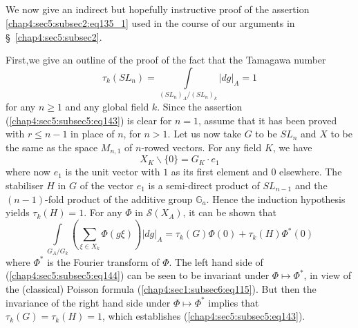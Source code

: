 \subsection{}\label{chap4:sec5:subsec6}%

We now give an indirect but hopefully instructive proof of the
assertion \ref{chap4:sec5:subsec2:eq135_1} used in the course of our
arguments in \S\ \ref{chap4:sec5:subsec2}. 

First,\pageoriginale we give an outline of the proof of the fact that
the Tamagawa number 
\begin{equation*}
  \tau_{k}(SL_{n})=\int\limits_{(SL_{n})_{A}/(SL_{n})_{k}}|dg|_{A}=1
  \tag{143}\label{chap4:sec5:subsec5:eq143} 
\end{equation*}
for any $n\geq 1$ and any global field $k$. Since the assertion
(\ref{chap4:sec5:subsec5:eq143})
 is clear for $n=1$, assume that it has been proved with $r\leq n-1$
 in place of $n$, for $n>1$. Let us now take $G$ to be $SL_{n}$ and
 $X$ to be the same as the space $M_{n,1}$ of $n$-rowed vectors. For
 any field $K$, we have
$$
X_{K}\backslash \{0\}=G_{K}\cdot e_{1}
$$
where now $e_{1}$ is the unit vector with $1$ as its first element and
$0$ elsewhere. The stabiliser $H$ in $G$ of the vector $e_{1}$ is a
semi-direct product of $SL_{n-1}$ and the $(n-1)$-fold product of the
additive group $\mathbb{G}_{a}$. Hence the induction hypothesis yields
$\tau_{k}(H)=1$. For any $\Phi$ in $\mathscr{S}(X_{A})$, it can be shown
that
\begin{equation*}
  \int\limits_{G_{A}/G_{k}}\left(\sum_{\xi\in
    X_{k}}\Phi(g\xi)\right)|dg|_{A}=\tau_{k}(G)\Phi(0)
  +\tau_{k}(H)\Phi^*(0)\tag{144}\label{chap4:sec5:subsec5:eq144} 
\end{equation*}
where $\Phi^{\ast}$ is the Fourier transform of $\Phi$. The left hand
side of (\ref{chap4:sec5:subsec5:eq144}) can be seen to be invariant under $\Phi\mapsto
\Phi^{\ast}$, in view of the (classical) Poisson formula
(\ref{chap4:sec1:subsec6:eq115}). But then the invariance of the right
hand side under 
$\Phi\mapsto \Phi^{\ast}$ implies that $\tau_{k}(G)=\tau_{k}(H)=1$,
which establishes (\ref{chap4:sec5:subsec5:eq143}).

